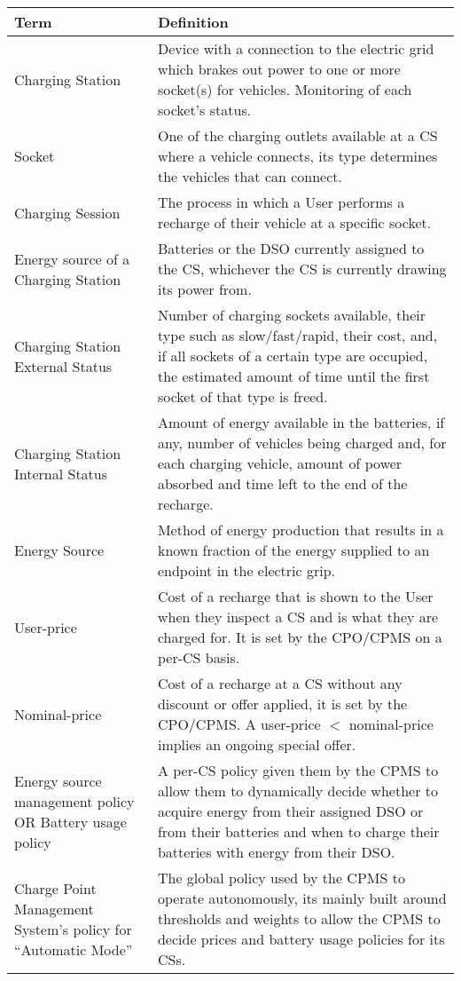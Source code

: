 \documentclass[11pt]{article}
\begin{document}
\begin{table}[H]
    \centering
    \setlength{\tabcolsep}{18pt}
    \renewcommand{\arraystretch}{1.2}
    \begin{tabularx}{\textwidth}{|>{\centering\hsize=0.4\hsize}X|>{\hsize=1.6\hsize}X|}
        \hline
        \textbf{Term} & \textbf{Definition} \\
        \hline
        Charging Station & Device with a connection to the electric grid which brakes out power to one or more socket(s) for vehicles. Monitoring of each socket's status. \\
        \hline
        Socket & One of the charging outlets available at a CS where a vehicle connects, its type determines the vehicles that can connect. \\
        \hline
        Charging Session & The process in which a User performs a recharge of their vehicle at a specific socket. \\
        \hline
        Energy source of a Charging Station & Batteries or the DSO currently assigned to the CS, whichever the CS is currently drawing its power from. \\
        \hline
        Charging Station External Status & Number of charging sockets available, their type such as slow/fast/rapid, their cost, and, if all sockets of a certain type are occupied, the estimated amount of time until the first socket of that type is freed. \\
        \hline
        Charging Station Internal Status & Amount of energy available in the batteries, if any, number of vehicles being charged and, for each charging vehicle, amount of power absorbed and time left to the end of the recharge. \\
        \hline
        Energy Source & Method of energy production that results in a known fraction of the energy supplied to an endpoint in the electric grip. \\
        \hline
        User-price & Cost of a recharge that is shown to the User when they inspect a CS and is what they are charged for. It is set by the CPO/CPMS on a per-CS basis.\\
        \hline
        Nominal-price & Cost of a recharge at a CS without any discount or offer applied, it is set by the CPO/CPMS. A user-price $<$ nominal-price implies an ongoing special offer. \\
        \hline
        Energy source management policy OR Battery usage policy & A per-CS policy given them by the CPMS to allow them to dynamically decide whether to acquire energy from their assigned DSO or from their batteries and when to charge their batteries with energy from their DSO. \\
        \hline
        Charge Point Management System's policy for “Automatic Mode” & The global policy used by the CPMS to operate autonomously, its mainly built around thresholds and weights to allow the CPMS to decide prices and battery usage policies for its CSs. \\
        \hline
    \end{tabularx}
    \label{tab:definitions}
\end{table}
\end{document}
